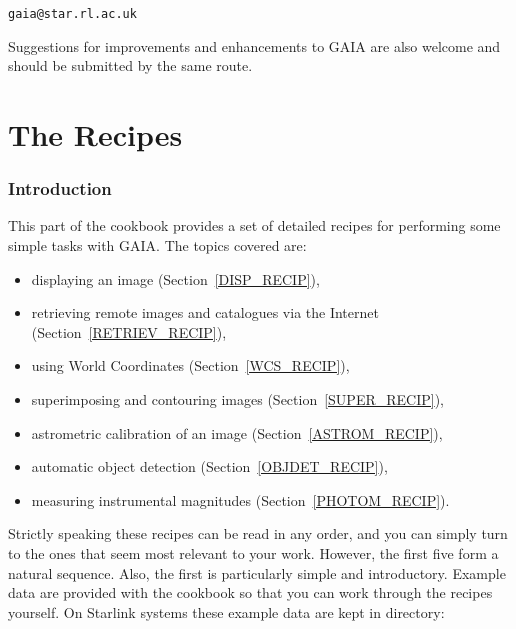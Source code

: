 \documentclass[twoside,11pt]{starlink}
\begin{document}
\begin{center}
\texttt{gaia@star.rl.ac.uk}
\end{center}

Suggestions for improvements and enhancements to GAIA are also welcome
and should be submitted by the same route.


\cleardoublepage

\part{The Recipes}


\section{\label{INTRO_RECIP}Introduction}

This part of the cookbook provides a set of detailed recipes for performing
some simple tasks with GAIA.  The topics covered are:

\begin{itemize}

  \item displaying an image (Section~\ref{DISP_RECIP}),

  \item retrieving remote images and catalogues via the Internet
   (Section~\ref{RETRIEV_RECIP}),

  \item using World Coordinates (Section~\ref{WCS_RECIP}),

  \item superimposing and contouring images (Section~\ref{SUPER_RECIP}),

  \item astrometric calibration of an image (Section~\ref{ASTROM_RECIP}),

  \item automatic object detection (Section~\ref{OBJDET_RECIP}),

  \item measuring instrumental magnitudes (Section~\ref{PHOTOM_RECIP}).

\end{itemize}

Strictly speaking these recipes can be read in any order, and you can
simply turn to the ones that seem most relevant to your work.  However, the
first five form a natural sequence.  Also, the first is particularly simple
and introductory.  Example data are provided with the cookbook so that you
can work through the recipes yourself.  On Starlink systems these example
data are kept in directory:
\end{document}
